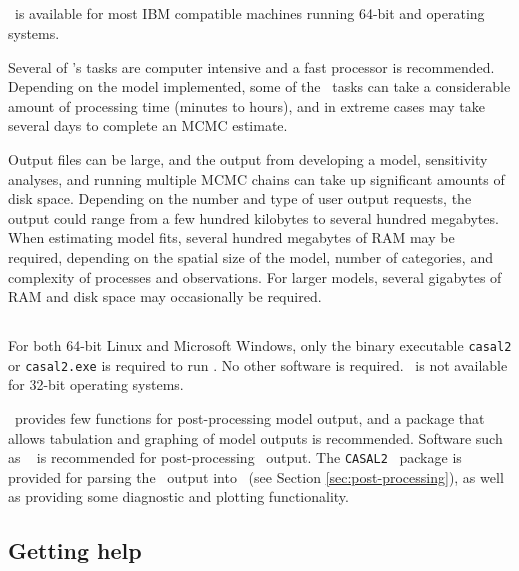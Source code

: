 \subsection{}

\CNAME\ is available for most IBM compatible machines running 64-bit  and  operating systems.

Several of \CNAME's tasks are computer intensive and a fast processor is recommended. Depending on the model implemented, some of the \CNAME\ tasks can take a considerable amount of processing time (minutes to hours), and in extreme cases may take several days to complete an MCMC estimate. 

Output files can be large, and the output from developing a model, sensitivity analyses, and running multiple MCMC chains can take up significant amounts of disk space. Depending on the number and type of user output requests, the output could range from a few hundred kilobytes to several hundred megabytes. When estimating model fits, several hundred megabytes of RAM may be required, depending on the spatial size of the model, number of categories, and complexity of processes and observations. For larger models, several gigabytes of RAM and disk space may occasionally be required. 

\subsection{}

For both 64-bit Linux and Microsoft Windows, only the binary executable \texttt{casal2} or \texttt{casal2.exe} is required to run \CNAME . No other software is required. \CNAME\ is not available for 32-bit operating systems. 

\CNAME\ provides few functions for post-processing model output, and a package that allows tabulation and graphing of model outputs is recommended. Software such as \href{http://www.r-project.org}{\R}\ \citep{R} is recommended for post-processing \CNAME\ output. The \texttt{CASAL2} \R\ package is provided for parsing the \CNAME\ output into \R\ (see Section \ref{sec:post-processing}), as well as providing some diagnostic and plotting functionality.

\subsection{Getting help}

